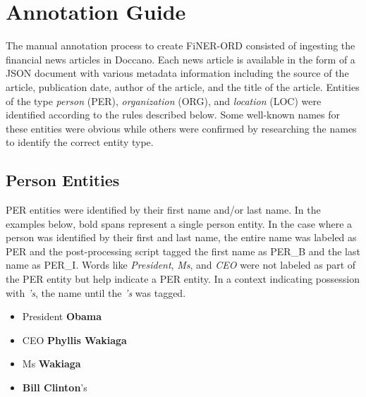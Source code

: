 \documentclass[11pt]{article}
\begin{document}
\section{Annotation Guide}
\label{app:annotation_guide}
The manual annotation process to create FiNER-ORD consisted of ingesting the financial news articles in Doccano. Each news article is available in the form of a JSON document with various metadata information including the source of the article, publication date, author of the article, and the title of the article. Entities of the type \textit{person} (PER), \textit{organization} (ORG), and \textit{location} (LOC) were identified according to the rules described below. Some well-known names for these entities were obvious while others were confirmed by researching the names to identify the correct entity type.

\subsection{Person Entities}
PER entities were identified by their first name and/or last name. In the examples below, bold spans represent a single person entity. In the case where a person was identified by their first and last name, the entire name was labeled as PER and the post-processing script tagged the first name as PER\_B and the last name as PER\_I. Words like \textit{President}, \textit{Ms}, and \textit{CEO} were not labeled as part of the PER entity but help indicate a PER entity. In a context indicating possession with \textit{'s}, the name until the \textit{'s} was tagged.
\begin{itemize}
    \item President \textbf{Obama}
    \item CEO \textbf{Phyllis Wakiaga}
    \item Ms \textbf{Wakiaga}
    \item \textbf{Bill Clinton}'s
\end{itemize}
\end{document}
